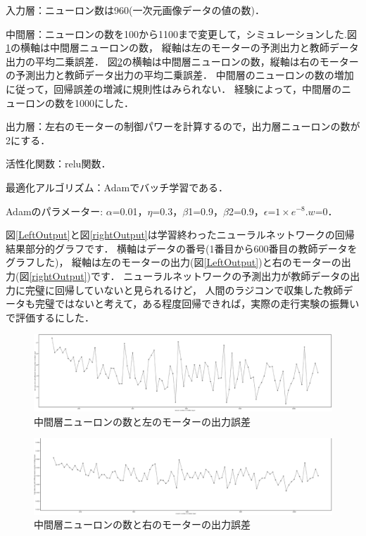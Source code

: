 入力層：ニューロン数は960(一次元画像データの値の数)．

中間層：ニューロンの数を100から1100まで変更して，シミュレーションした.図\ref{anti_left}の横軸は中間層ニューロンの数，
縦軸は左のモーターの予測出力と教師データ出力の平均二乗誤差．
図\ref{anti_right}の横軸は中間層ニューロンの数，縦軸は右のモーターの予測出力と教師データ出力の平均二乗誤差．
中間層のニューロンの数の増加に従って，回帰誤差の増減に規則性はみられない．
経験によって，中間層のニューロンの数を1000にした．

出力層：左右のモーターの制御パワーを計算するので，出力層ニューロンの数が2にする．

活性化関数：relu関数．

最適化アルゴリズム：Adamでバッチ学習である．

Adamのパラメーター: $\alpha$=0.01，$\eta$=0.3，$\beta$1=0.9，$\beta$2=0.9，$\epsilon$=$1\times e^{-8}$.$w$=0．

図\ref{LeftOutput}と図\ref{rightOutput}は学習終わったニューラルネットワークの回帰結果部分的グラフです．
横軸はデータの番号(1番目から600番目の教師データをグラフした)，
縦軸は左のモーターの出力(図\ref{LeftOutput})と右のモーターの出力(図\ref{rightOutput})です．
ニューラルネットワークの予測出力が教師データの出力に完璧に回帰していないと見られるけど，
人間のラジコンで収集した教師データも完璧ではないと考えて，ある程度回帰できれば，実際の走行実験の振舞いで評価するにした．

\vspace{-2mm}
\begin{figure}[h]
        \centering
        \includegraphics[width=1.0\linewidth]{anti_left.eps}
        \caption{中間層ニューロンの数と左のモーターの出力誤差}
        \label{anti_left}
\end{figure}
\vspace{-5mm}
\begin{figure}[h]
        \centering
        \includegraphics[width=1.0\linewidth]{anti_right.eps}
        \caption{中間層ニューロンの数と右のモーターの出力誤差}
        \label{anti_right}
\end{figure}

